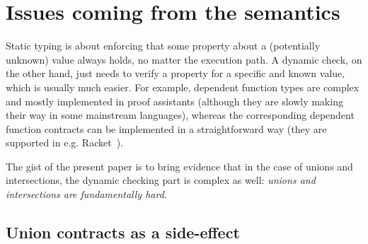 \documentclass[sigplan,10pt,review,anonymous]{acmart}
\newcommand{\info}[2][1=]{}
\begin{document}
\section{Issues coming from the semantics}
\label{sec:issues-sem}
\info{What goes wrong or difficult when trying to implement union and
  intersection literally}

Static typing is about enforcing that some property about a (potentially
unknown) value always holds, no matter the execution path. A dynamic check, on
the other hand, just needs to verify a property for a specific and known value,
which is usually much easier. For example, dependent function types are complex
and mostly implemented in proof assistants (although they are slowly making
their way in some mainstream languages), whereas the corresponding dependent
function contracts can be implemented in a straightforward way (they are
supported in e.g. Racket~\cite{}).

The gist of the present paper is to bring evidence that in the case of unions
and intersections, the dynamic checking part is complex as well: \emph{unions
and intersections are fundamentally hard}.

%
%

\subsection{Union contracts as a side-effect}
\end{document}
